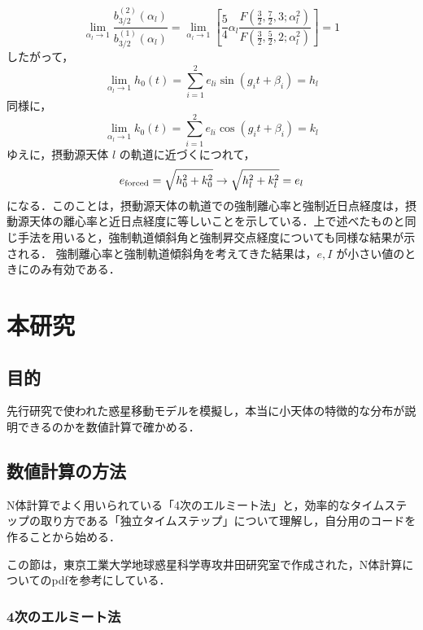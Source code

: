 \documentclass[11pt,a4paper,oneside,onecolumn]{jreport}
\begin{document}
\begin{equation}
\lim_{\alpha_l \rightarrow 1} \frac{b_{3/2}^{(2)} (\alpha_l)}{b_{3/2}^{(1)} (\alpha_l)} = \lim_{\alpha_l \rightarrow 1} \left[ \frac{5}{4} \alpha_l \frac{F (\frac{3}{2}, \frac{7}{2}, 3; \alpha_l^2)}{F (\frac{3}{2}, \frac{5}{2}, 2; \alpha_l^2)} \right] = 1
\end{equation}
したがって，
\begin{equation}
\lim_{\alpha_l \rightarrow 1} h_0 (t) = \sum_{i = 1}^2 e_{li} \sin (g_i t + \beta_i) = h_l
\end{equation}
同様に，
\begin{equation}
\lim_{\alpha_l \rightarrow 1} k_0 (t) = \sum_{i = 1}^2 e_{li} \cos (g_i t + \beta_i) = k_l
\end{equation}
ゆえに，摂動源天体 $l$ の軌道に近づくにつれて，
\begin{equation}
e_{\rm forced} = \sqrt{h_0^2 + k_0^2} \rightarrow \sqrt{h_l^2 + k_l^2} = e_l 
\end{equation}
になる．このことは，摂動源天体の軌道での強制離心率と強制近日点経度は，摂動源天体の離心率と近日点経度に等しいことを示している．上で述べたものと同じ手法を用いると，強制軌道傾斜角と強制昇交点経度についても同様な結果が示される．
強制離心率と強制軌道傾斜角を考えてきた結果は，$e, I$ が小さい値のときにのみ有効である．

\chapter{本研究}
\section{目的}
先行研究で使われた惑星移動モデル\cite{Minton}\cite{Malhotra}を模擬し，本当に小天体の特徴的な分布が説明できるのかを数値計算で確かめる．

\section{数値計算の方法}
N体計算でよく用いられている「4次のエルミート法」と，効率的なタイムステップの取り方である「独立タイムステップ」について理解し，自分用のコードを作ることから始める．

この節は，東京工業大学地球惑星科学専攻井田研究室で作成された，N体計算についてのpdf\cite{Nbody}を参考にしている．
\subsection{4次のエルミート法 \label{sec:Hermite}}
\end{document}
